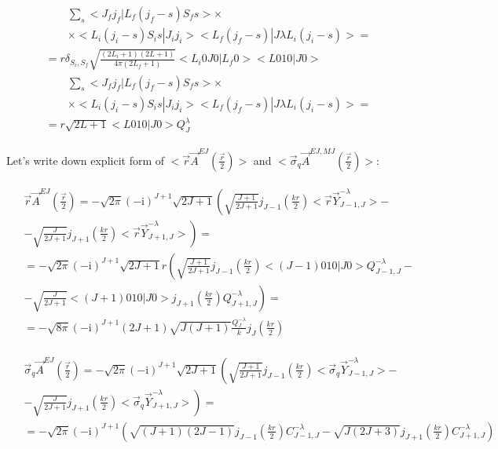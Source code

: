 \begin{align}
\begin{split}
        &\qquad \sum_{s} <J_f j_f| L_f (j_f - s) S_f s> \times \\
        &\qquad\times <L_i (j_i - s) S_i s | J_i j_i> <L_f (j_f - s)| J \lambda L_i (j_i - s)> = \\
        &= r \delta_{S_i, S_f} \sqrt{\frac{(2L_i+1)(2L+1)}{4 \pi (2L_f+1)}} <L_i 0 J 0 | L_f 0> <L 0 1 0 | J 0> \\
        &\qquad \sum_{s} <J_f j_f| L_f (j_f - s) S_f s> \times \\
        &\qquad\times <L_i (j_i - s) S_i s | J_i j_i> <L_f (j_f - s)| J \lambda L_i (j_i - s)> = \\
        &=r \sqrt{2L+1} <L 0 1 0 | J 0> Q_{J}^{\lambda}
    \end{split}
\end{align}

Let's write down explicit form of $<\vec{r}\vec{A}^{EJ}(\frac{\vec{r}}{2})>$ and $<\vec{\sigma}_{q}\vec{A}^{EJ, MJ}(\frac{\vec{r}}{2})>$:

\begin{align}
    \begin{split}
        &\vec{r} \vec{A}^{EJ}(\frac{\vec{r}}{2}) = -\sqrt{2\pi} (- \mathrm{i})^{J+1} \sqrt{2J+1} \left( \sqrt{\frac{J+1}{2J+1}} j_{J-1}(\frac{kr}{2})<\vec{r} \vec{Y}^{-\lambda}_{J-1, J}> - \right.\\
        &- \left. \sqrt{\frac{J}{2J+1}} j_{J+1}(\frac{kr}{2}) <\vec{r} \vec{Y}_{J+1, J}^{-\lambda}> \right) = \\
        &= -\sqrt{2\pi} (- \mathrm{i})^{J+1} \sqrt{2J+1} r \left( \sqrt{\frac{J+1}{2J+1}} j_{J-1}(\frac{kr}{2}) <(J-1) 0 1 0 | J 0> Q_{J-1, J}^{- \lambda} - \right.\\
        &- \left. \sqrt{\frac{J}{2J+1}} <(J+1) 0 1 0 | J 0> j_{J+1}(\frac{kr}{2}) Q_{J+1, J}^{- \lambda} \right) = \\ 
    &= -\sqrt{8\pi} (- \mathrm{i})^{J+1} (2J+1) \sqrt{J (J+1)}  \frac{Q_{J}^{- \lambda}}{k} j_J(\frac{k r}{2})
    \end{split}
\end{align}

\begin{align}
    \begin{split}
        &\vec{\sigma}_q \vec{A}^{EJ}(\frac{\vec{r}}{2}) = -\sqrt{2\pi} (- \mathrm{i})^{J+1} \sqrt{2J+1} \left( \sqrt{\frac{J+1}{2J+1}} j_{J-1}(\frac{kr}{2})<\vec{\sigma}_q \vec{Y}^{- \lambda}_{J-1, J}> - \right.\\
        &\left. -\sqrt{\frac{J}{2J+1}} j_{J+1}(\frac{kr}{2}) <\vec{\sigma}_q \vec{Y}_{J+1, J}^{- \lambda}> \right) = \\
        &= -\sqrt{2\pi} (- \mathrm{i})^{J+1} \left( \sqrt{(J+1)(2J-1)} j_{J-1}(\frac{kr}{2}) C_{J-1, J}^{- \lambda} - \sqrt{J(2J+3)} j_{J+1}(\frac{kr}{2}) C_{J+1, J}^{- \lambda} \right)
    \end{split}
\end{align}

